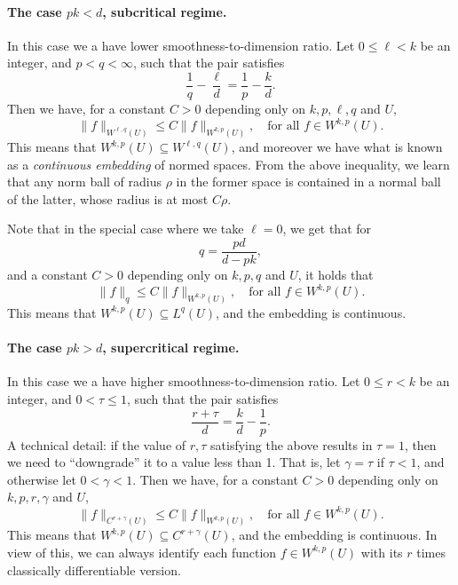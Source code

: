 \documentclass{article}
\begin{document}
\paragraph{The case $pk < d$, subcritical regime.}

In this case we a have lower smoothness-to-dimension ratio. Let $0 \leq \ell <
k$ be an integer, and $p < q < \infty$, such that the pair satisfies   
\[
\frac{1}{q} - \frac{\ell}{d} = \frac{1}{p} - \frac{k}{d}.
\]
Then we have, for a constant $C>0$ depending only on $k,p,\ell,q$ and $U$, 
\[
\|f\|_{W^{\ell,q}(U)} \leq C \|f\|_{W^{k,p}(U)}, \quad \text{for all $f \in
  W^{k,p}(U)$}.
\]
This means that $W^{k,p}(U) \subseteq W^{\ell,q}(U)$, and moreover we have what 
is known as a \emph{continuous embedding} of normed spaces. From the above    
inequality, we learn that any norm ball of radius $\rho$ in the former space
is contained in a normal ball of the latter, whose radius is at most $C\rho$.

Note that in the special case where we take $\ell = 0$, we get that for  
\[
q = \frac{pd}{d-pk},
\]
and a constant $C>0$ depending only on $k,p,q$ and $U$, it holds that 
\[
\|f\|_q \leq C \|f\|_{W^{k,p}(U)}, \quad \text{for all $f \in W^{k,p}(U)$}. 
\]
This means that $W^{k,p}(U) \subseteq L^q(U)$, and the embedding is continuous.  


\paragraph{The case $pk > d$, supercritical regime.}

In this case we a have higher smoothness-to-dimension ratio. Let $0 \leq r < k$
be an integer, and $0 < \tau \leq 1$, such that the pair satisfies 
\[
\frac{r+\tau}{d} = \frac{k}{d} - \frac{1}{p}.
\]
A technical detail: if the value of $r,\tau$ satisfying the above results in
$\tau = 1$, then we need to ``downgrade'' it to a value less than 1. That is,
let $\gamma = \tau$ if $\tau < 1$, and otherwise let $0 < \gamma < 1$. Then we
have, for a constant $C>0$ depending only on $k,p,r,\gamma$ and $U$,       
\[
\|f\|_{C^{r+\gamma}(U)} \leq C \|f\|_{W^{k,p}(U)}, \quad \text{for all $f \in
  W^{k,p}(U)$}. 
\]
This means that $W^{k,p}(U) \subseteq C^{r+\gamma}(U)$, and the embedding is
continuous. In view of this, we can always identify each function $f \in
W^{k,p}(U)$ with its $r$ times classically differentiable version.     
\end{document}
